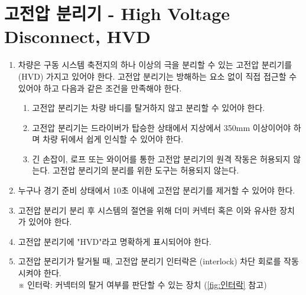 \documentclass[final,a4paper,10pt]{report}
\begin{document}
\section{고전압 분리기 - High Voltage Disconnect, HVD}
\begin{enumerate}
  \item 차량은 구동 시스템 축전지의 하나 이상의 극을 분리할 수 있는 고전압 분리기를(HVD) 가지고 있어야 한다. 고전압 분리기는 방해하는 요소 없이 직접 접근할 수 있어야 하고 다음과 같은 조건을 만족해야 한다.
    \begin{enumerate}
      \item 고전압 분리기는 차량 바디를 탈거하지 않고 분리할 수 있어야 한다.
      \item 고전압 분리기는 드라이버가 탑승한 상태에서 지상에서 350mm 이상이어야 하며 차량 뒤에서 쉽게 인식할 수 있어야 한다.
      \item 긴 손잡이, 로프 또는 와이어를 통한 고전압 분리기의 원격 작동은 허용되지 않는다. 고전압 분리기의 분리를 위한 도구는 허용되지 않는다.
    \end{enumerate}
    
  \item 누구나 경기 준비 상태에서 10초 이내에 고전압 분리기를 제거할 수 있어야 한다.
  \item 고전압 분리기 분리 후 시스템의 절연을 위해 더미 커넥터 혹은 이와 유사한 장치가 있어야 한다.
  \item 고전압 분리기에 "HVD"라고 명확하게 표시되어야 한다.
  \item 고전압 분리기가 탈거될 때, 고전압 분리기 인터락은 (interlock) 차단 회로를 작동시켜야 한다.\\
    ※ 인터락: 커넥터의 탈거 여부를 판단할 수 있는 장치 (\cref{fig:인터락} 참고)
\end{enumerate}

\end{document}
